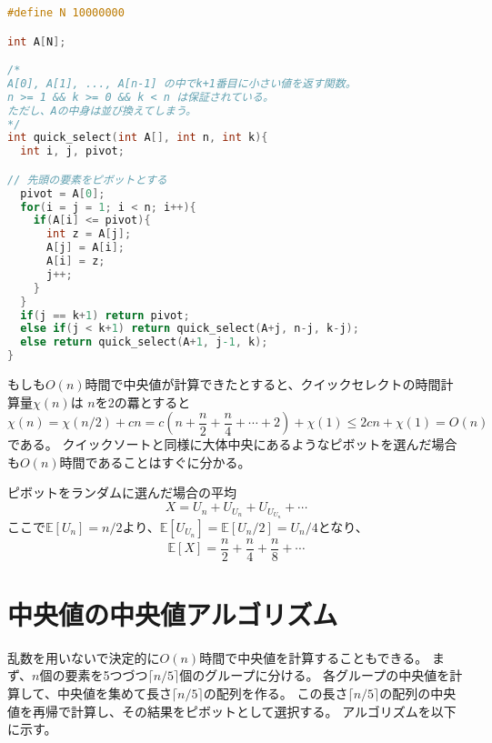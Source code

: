 \documentclass[a4paper,twoside,onecolumn,openany,article,10pt]{memoir}
\theoremstyle{remark}
\begin{document}
\begin{lstlisting}[basicstyle=\ttfamily\normalsize,showstringspaces=false,language=C,frame=single]
#define N 10000000

int A[N];

/*
A[0], A[1], ..., A[n-1] の中でk+1番目に小さい値を返す関数。
n >= 1 && k >= 0 && k < n は保証されている。
ただし、Aの中身は並び換えてしまう。
*/
int quick_select(int A[], int n, int k){
  int i, j, pivot;

// 先頭の要素をピボットとする
  pivot = A[0];
  for(i = j = 1; i < n; i++){
    if(A[i] <= pivot){
      int z = A[j];
      A[j] = A[i];
      A[i] = z;
      j++;
    }
  }
  if(j == k+1) return pivot;
  else if(j < k+1) return quick_select(A+j, n-j, k-j);
  else return quick_select(A+1, j-1, k);
}
\end{lstlisting}

もしも$O(n)$時間で中央値が計算できたとすると、クイックセレクトの時間計算量$\chi(n)$は
$n$を2の羃とすると
\begin{equation*}
\chi(n) = \chi(n/2) + cn = c\left(n+\frac{n}2 + \frac{n}4 + \dotsb + 2\right) + \chi(1) \le 2c n + \chi(1) = O(n)
\end{equation*}
である。
クイックソートと同様に大体中央にあるようなピボットを選んだ場合も$O(n)$時間であることはすぐに分かる。

ピボットをランダムに選んだ場合の平均
\begin{equation*}
X = U_n + U_{U_n} + U_{U_{U_n}} + \dotsb
\end{equation*}
ここで$\mathbb{E}[U_n] = n/2$より、$\mathbb{E}[U_{U_n}] = \mathbb{E}[U_n/2] = U_n/4$となり、
\begin{equation*}
\mathbb{E}[X] =  \frac{n}2 + \frac{n}4 + \frac{n}8 + \dotsb
\end{equation*}
\fi


\section{中央値の中央値アルゴリズム}
乱数を用いないで決定的に$O(n)$時間で中央値を計算することもできる。
まず、$n$個の要素を5つづつ$\lceil n/5\rceil$個のグループに分ける。
各グループの中央値を計算して、中央値を集めて長さ$\lceil n/5\rceil$の配列を作る。
この長さ$\lceil n/5\rceil$の配列の中央値を再帰で計算し、その結果をピボットとして選択する。
アルゴリズムを以下に示す。
\end{document}
